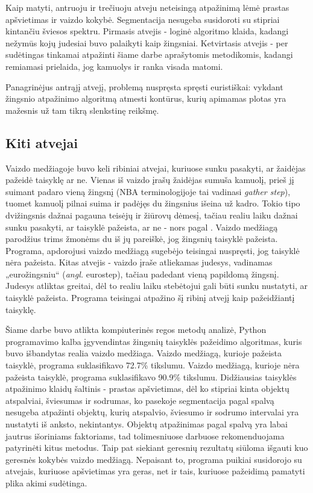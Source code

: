 \documentclass{VUMIFPSkursinis}
\begin{document}
Kaip matyti, antruoju ir trečiuoju atveju neteisingą atpažinimą lėmė prastas apšvietimas ir vaizdo kokybė. Segmentacija nesugeba susidoroti su stipriai kintančiu šviesos spektru. Pirmasis atvejis - loginė algoritmo klaida, kadangi nežymūs kojų judesiai buvo palaikyti kaip žingsniai. Ketvirtasis atvejis - per sudėtingas tinkamai atpažinti šiame darbe aprašytomis metodikomis, kadangi remiamasi prielaida, jog kamuolys ir ranka visada matomi.

Panagrinėjus antrąjį atvejį, problemą nuspręsta spręsti euristiškai: vykdant žingsnio atpažinimo algoritmą atmesti kontūrus, kurių apimamas plotas yra mažesnis už tam tikrą slenkstinę reikšmę. 

\subsection{Kiti atvejai}
 Vaizdo medžiagoje buvo keli ribiniai atvejai, kuriuose sunku pasakyti, ar žaidėjas pažeidė taisyklę ar ne. Vienas iš vaizdo įrašų žaidėjas sumuša kamuolį, prieš jį suimant padaro vieną žingsnį (NBA terminologijoje tai vadinasi \textit{gather step}), tuomet kamuolį pilnai suima ir padėjęs du žingsnius išeina už kadro. Tokio tipo dvižingsnis dažnai pagauna teisėjų ir žiūrovų dėmesį, tačiau realiu laiku dažnai sunku pasakyti, ar taisyklė pažeista, ar ne - nors pagal . Vaizdo medžiagą parodžius trims žmonėms du iš jų pareiškė, jog žingsnių taisyklė pažeista. Programa, apdorojusi vaizdo medžiagą sugebėjo teisingai nuspręsti, jog taisyklė nėra pažeista. Kitas atvejis - vaizdo įraše atliekamas judesys, vadinamas „eurožingsniu“ (\textit{angl.} eurostep), tačiau padedant vieną papildomą žingsnį. Judesys atliktas greitai, dėl to realiu laiku stebėtojui gali būti sunku nustatyti, ar taisyklė pažeista. Programa teisingai atpažino šį ribinį atvejį kaip pažeidžiantį taisyklę. 


Šiame darbe buvo atlikta kompiuterinės regos metodų analizė, Python programavimo kalba įgyvendintas žingsnių taisyklės pažeidimo algoritmas, kuris buvo išbandytas realia vaizdo medžiaga. 
Vaizdo medžiagą, kurioje pažeista taisyklė, programa suklasifikavo 72.7\% tikslumu. Vaizdo medžiagą, kurioje nėra pažeista taisyklė, programa suklasifikavo 90.9\% tikslumu. Didžiausias taisyklės atpažinimo klaidų šaltinis - prastas apšvietimas, dėl ko stipriai kinta objektų atspalviai, šviesumas ir sodrumas, ko pasekoje segmentacija pagal spalvą nesugeba atpažinti objektų, kurių atspalvio, šviesumo ir sodrumo intervalai yra nustatyti iš anksto, nekintantys. Objektų atpažinimas pagal spalvą yra labai jautrus išoriniams faktoriams, tad tolimesniuose darbuose rekomenduojama patyrinėti kitus metodus. Taip pat siekiant geresnių rezultatų siūloma išgauti kuo geresnės kokybės vaizdo medžiagą.
Nepaisant to, programa puikiai susidorojo su atvejais, kuriuose apšvietimas yra geras, net ir tais, kuriuose pažeidimą pamatyti plika akimi sudėtinga. 
\end{document}
